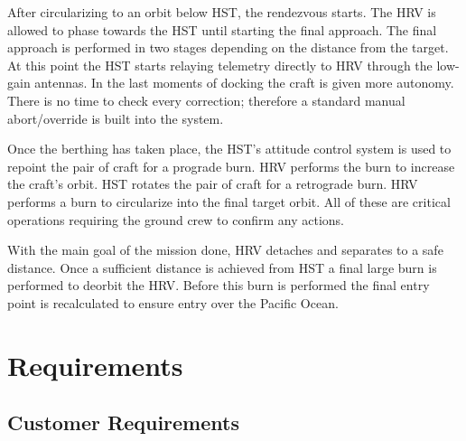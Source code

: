\documentclass[paper=letter, fontsize=11pt]{scrartcl} %
\numberwithin{equation}{section} %
\numberwithin{figure}{section} %
\numberwithin{table}{section} %
\begin{document}
After circularizing to an orbit below HST, the rendezvous starts. The HRV is allowed to phase towards the HST until starting the final approach. The final approach is performed in two stages depending on the distance from the target. At this point the HST starts relaying telemetry directly to HRV through the low-gain antennas. In the last moments of docking the craft is given more autonomy. There is no time to check every correction; therefore a standard manual abort/override is built into the system.

Once the berthing has taken place, the HST's attitude control system is used to repoint the pair of craft for a prograde burn. HRV performs the burn to increase the craft's orbit. HST rotates the pair of craft for a retrograde burn. HRV performs a burn to circularize into the final target orbit. All of these are critical operations requiring the ground crew to confirm any actions.

With the main goal of the mission done, HRV detaches and separates to a safe distance. Once a sufficient distance is achieved from HST a final large burn is performed to deorbit the HRV. Before this burn is performed the final entry point is recalculated to ensure entry over the Pacific Ocean.



\section{Requirements} \label{section:reqs}

\subsection{Customer Requirements}
\end{document}
